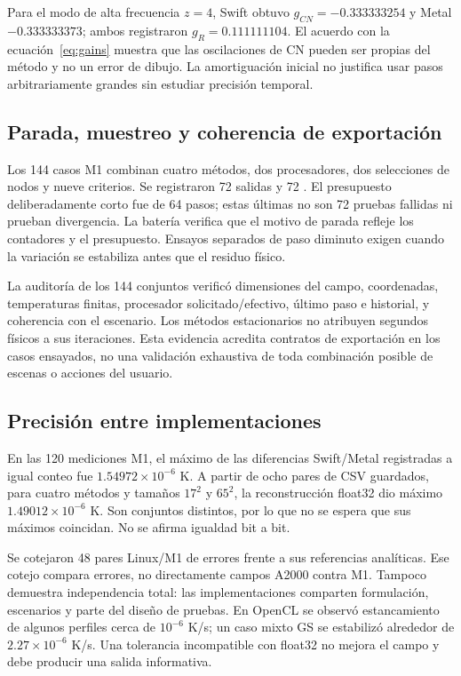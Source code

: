 \documentclass[11pt,a4paper]{article}
\newcommand{\code}[1]{\texttt{\detokenize{#1}}}
\begin{document}
Para el modo de alta frecuencia $z=4$, Swift obtuvo $g_{CN}=-0.333333254$ y Metal $-0.333333373$; ambos registraron $g_R=0.111111104$. El acuerdo con la ecuación~\eqref{eq:gains} muestra que las oscilaciones de CN pueden ser propias del método y no un error de dibujo. La amortiguación inicial no justifica usar pasos arbitrariamente grandes sin estudiar precisión temporal.

\subsection{Parada, muestreo y coherencia de exportación}
Los 144 casos M1 combinan cuatro métodos, dos procesadores, dos selecciones de nodos y nueve criterios. Se registraron 72 salidas \code{converged} y 72 \code{max_steps}. El presupuesto deliberadamente corto fue de 64 pasos; estas últimas no son 72 pruebas fallidas ni prueban divergencia. La batería verifica que el motivo de parada refleje los contadores y el presupuesto. Ensayos separados de paso diminuto exigen \code{criterion_met} cuando la variación se estabiliza antes que el residuo físico.

La auditoría de los 144 conjuntos verificó dimensiones del campo, coordenadas, temperaturas finitas, procesador solicitado/efectivo, último paso e historial, y coherencia con el escenario. Los métodos estacionarios no atribuyen segundos físicos a sus iteraciones. Esta evidencia acredita contratos de exportación en los casos ensayados, no una validación exhaustiva de toda combinación posible de escenas o acciones del usuario.

\subsection{Precisión entre implementaciones}
En las 120 mediciones M1, el máximo de las diferencias Swift/Metal registradas a igual conteo fue $1.54972\times10^{-6}$ K. A partir de ocho pares de CSV guardados, para cuatro métodos y tamaños $17^2$ y $65^2$, la reconstrucción float32 dio máximo $1.49012\times10^{-6}$ K. Son conjuntos distintos, por lo que no se espera que sus máximos coincidan. No se afirma igualdad bit a bit.

Se cotejaron 48 pares Linux/M1 de errores frente a sus referencias analíticas. Ese cotejo compara errores, no directamente campos A2000 contra M1. Tampoco demuestra independencia total: las implementaciones comparten formulación, escenarios y parte del diseño de pruebas. En OpenCL se observó estancamiento de algunos perfiles cerca de $10^{-6}$ K/s; un caso mixto GS se estabilizó alrededor de $2.27\times10^{-6}$ K/s. Una tolerancia incompatible con float32 no mejora el campo y debe producir una salida informativa.
\end{document}

